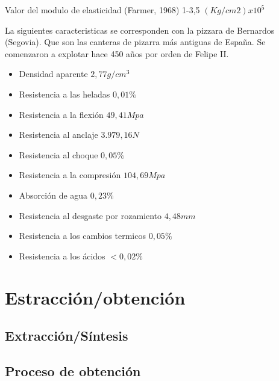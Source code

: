 Valor del modulo de elasticidad (Farmer, 1968) 1-3,5 $(Kg/cm2) x 10^5$
\par
La siguientes caracteristicas se corresponden con la pizzara de Bernardos (Segovia). Que son las canteras de pizarra más antiguas de España. Se comenzaron a explotar hace 450 años por orden de Felipe II.

 \begin{itemize}
        \item Densidad aparente $2,77 g/cm^3$ 
	\item Resistencia a las heladas $0,01\%$
	\item Resistencia a la flexión $49,41 Mpa$
	\item Resistencia al anclaje $3.979,16 N$
	\item Resistencia al choque $0,05\%$
	\item Resistencia a la compresión $104,69 Mpa$
	\item Absorción de agua $0,23\%$
	\item Resistencia al desgaste por rozamiento $4,48 mm$
	\item Resistencia a los cambios termicos $0,05\%$
	\item Resistencia a los ácidos $<0,02\%$
   \end{itemize}

\clearpage

\section {Estracción/obtención}

	\subsection {Extracción/Síntesis}

	\subsection {Proceso de obtención}
